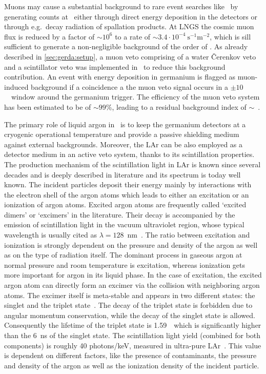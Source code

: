 Muons may cause a substantial background to rare event searches like \gerda\ by generating
counts at \qbb\ either through direct energy deposition in the detectors or through
e.g.~decay radiation of spallation products. At LNGS the cosmic muon flux is reduced by a
factor of ${\sim}10^6$ to a rate of ${\sim}3.4 \cdot 10^{−4}~\text{s}^{-1}\text{m}^{-2}$,
which is sill sufficient to generate a non-negligible background of the order of
.  As already described in \cref{sec:gerda:setup}, a muon veto comprising of
a water \v{C}erenkov veto and a scintillator veto was implemented in \gerda\ to reduce
this background contribution. An event with energy deposition in germanium is flagged
as muon-induced background if a coincidence a the muon veto signal occurs in a $\pm
10$~\mus\ window around the germanium trigger. The efficiency of the muon veto system
has been estimated to be of ${\sim}99$\%, leading to a residual background index of
${\sim}$~\cite{Freund2016}.

The primary role of liquid argon in \gerda\ is to keep the germanium detectors at a
cryogenic operational temperature and provide a passive shielding medium against external
backgrounds. Moreover, the LAr can be also employed as a detector medium in an active veto
system, thanks to its scintillation properties. The production mechanism of the
scintillation light in LAr is known since several decades and is deeply described in
literature and its spectrum is today well known. The incident particles deposit their
energy mainly by interactions with the electron shell of the argon atoms which leads to
either an excitation or an ionization of argon atoms. Excited argon atoms are frequently
called `excited dimers' or `excimers' in the literature. Their decay is accompanied by the
emission of scintillation light in the vacuum ultraviolet region, whose typical wavelength
is usually cited as $\lambda = 128$~nm~\cite{Heindl2010}. The ratio between excitation and
ionization is strongly dependent on the pressure and density of the argon as well as on
the type of radiation itself. The dominant process in gaseous argon at normal pressure and
room temperature is excitation, whereas ionization gets more important for argon in its
liquid phase. In the case of excitation, the excited argon atom can directly form an
excimer via the collision with neighboring argon atoms. The excimer itself is meta-stable
and appears in two different states: the singlet and the triplet state~\cite{Jortner1965,
McCusker1984}.  The decay of the triplet state is forbidden due to angular momentum
conservation, while the decay of the singlet state is allowed. Consequently the lifetime
of the triplet state is 1.59~\mus\ which is significantly higher than the 6~ns of the
singlet state. The scintillation light yield (combined for both components) is roughly 40
photons/keV, measured in ultra-pure LAr~\cite{Doke1998}. This value is dependent on
different factors, like the presence of contaminants, the pressure and density of the
argon as well as the ionization density of the incident particle.

